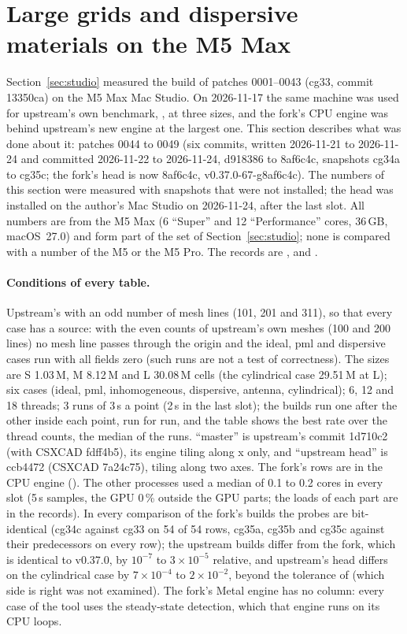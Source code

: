 \section{Large grids and dispersive materials on the M5 Max}\label{sec:large}

Section~\ref{sec:studio} measured the build of patches 0001--0043 (cg33, commit 13350ca) on the M5 Max Mac Studio. On
2026-11-17 the same machine was used for upstream's own benchmark, , at three sizes, and the
fork's CPU engine was behind upstream's new  engine at the largest one. This section describes what was done
about it: patches 0044 to 0049 (six commits, written 2026-11-21 to 2026-11-24 and committed 2026-11-22 to 2026-11-24, d918386 to 8af6c4c, snapshots cg34a to cg35c;
the fork's head is now 8af6c4c, v0.37.0-67-g8af6c4c). The numbers of this section were measured with snapshots that were not installed; the
head was installed on the author's Mac Studio on 2026-11-24, after the last slot. All numbers are from the M5 Max (6 ``Super'' and 12 ``Performance'' cores, 36\,GB, macOS~27.0) and
form part of the set of Section~\ref{sec:studio}; none is compared with a number of the M5 or the M5 Pro. The records
are ,  and
.

\paragraph{Conditions of every table.} Upstream's  with an odd number of mesh lines (101, 201 and 311), so that
every case has a source: with the even counts of upstream's own meshes (100 and 200 lines) no mesh line passes through the
origin and the ideal, pml and dispersive cases run with all fields zero (such runs are not a test of correctness). The sizes are S 1.03\,M, M 8.12\,M and L 30.08\,M cells (the cylindrical case 29.51\,M at L);
six cases (ideal, pml, inhomogeneous, dispersive, antenna, cylindrical); 6, 12 and 18 threads; 3 runs of 3\,s a point
(2\,s in the last slot); the builds run one after the other inside each point, run for run, and the table shows the best
rate over the thread counts, the median of the runs. ``master'' is upstream's commit 1d710c2 (with CSXCAD fdff4b5), its
 engine tiling along x only, and ``upstream head'' is ccb4472 (CSXCAD 7a24c75), tiling along two axes. The fork's
rows are in the CPU engine (). The other processes used a median of 0.1 to 0.2 cores in every slot
(5\,s samples, the GPU 0\,\% outside the GPU parts; the loads of each part are in the records). In every comparison of
the fork's builds the probes are bit-identical (cg34c against cg33 on 54 of 54 rows, cg35a, cg35b and cg35c against their
predecessors on every row); the upstream builds differ from the fork, which is identical to v0.37.0, by $10^{-7}$ to
$3\times10^{-5}$ relative, and upstream's head differs on the cylindrical case by $7\times10^{-4}$ to
$2\times10^{-2}$, beyond the tolerance of  (which side is right was not examined). The fork's Metal engine has no column: every case of the tool uses the
steady-state detection, which that engine runs on its CPU loops.

